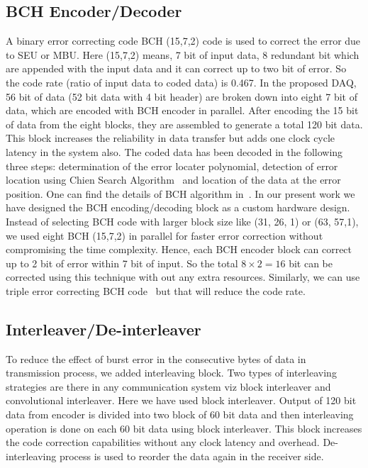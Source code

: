 \documentclass[a4paper]{jpconf}
\begin{document}
\subsection{BCH Encoder/Decoder}A binary error correcting code BCH (15,7,2) code is used to correct the error due to SEU or MBU. Here (15,7,2) means, 7 bit of input data, 8 redundant bit which are appended with the input data and it can correct up to two bit of error. So the code rate (ratio of input data to coded data) is 0.467. In the proposed DAQ, 56 bit of data (52 bit data with 4 bit header) are broken down into eight 7 bit of data, which are encoded with BCH encoder in parallel. After encoding the 15 bit of data from the eight blocks, they are assembled to generate a total 120 bit data. This block increases the reliability in data transfer but adds one clock cycle latency in the system also. The coded data has been decoded in the following three steps: determination of the error locater polynomial, detection of error location using Chien Search Algorithm~\cite{chien:search} and location of the data at the error position. One can find the details of BCH algorithm in~\cite{chien:search}. In our present work we have designed the BCH encoding/decoding block as a custom hardware design. Instead of selecting BCH code with larger block size like (31, 26, 1) or (63, 57,1), we used eight BCH (15,7,2) in parallel for faster error correction without compromising the time complexity. Hence, each BCH encoder block can correct up to 2 bit of error within 7 bit of input. So the total  $8\times 2 = 16$  bit can be corrected using this technique with out any extra resources. Similarly, we can use triple error correcting BCH code~\cite{chien:search} but that will reduce the code rate.
\vspace{-1 pc}
\subsection{Interleaver/De-interleaver}To reduce the effect of burst error in the consecutive bytes of data in transmission process, we added interleaving block. Two types of interleaving strategies are there in any communication system viz block interleaver and convolutional interleaver. Here we have used block interleaver. Output of 120 bit data from encoder is divided into two block of 60 bit data and then interleaving operation is done on each 60 bit data using block interleaver. This block increases the code correction capabilities without any clock latency and overhead. De-interleaving process is used to reorder the data again in the receiver side.
\vspace{-1 pc}
\end{document}
